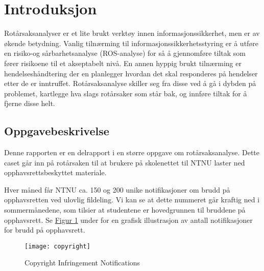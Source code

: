 \chapter{Introduksjon}
Rotårsaksanalyser er et lite brukt verktøy innen informasjonssikkerhet, men er av økende betydning. Vanlig tilnærming til informasjonssikkerhetsstyring er å utføre en risiko-og sårbarhetsanalyse (ROS-analyse) for så å gjennomføre tiltak som fører risikoene til et akseptabelt nivå. En annen hyppig brukt tilnærming er hendelseshåndtering der en planlegger hvordan det skal responderes på hendelser etter de er inntruffet. Rotårsaksanalyse skiller seg fra disse ved å gå i dybden på problemet, kartlegge hva slags rotårsaker som står bak, og innføre tiltak for å fjerne disse helt.

\section{Oppgavebeskrivelse}
Denne rapporten er en delrapport i en større oppgave om rotårsaksanalyse. Dette caset går inn på rotårsaken til at brukere på skolenettet til NTNU laster ned opphavsrettsbeskyttet materiale.

Hver måned får NTNU ca. 150 og 200 unike notifikasjoner om brudd på opphavsretten ved ulovlig fildeling. Vi kan se at dette nummeret går kraftig ned i sommermånedene, som tilsier at studentene er hovedgrunnen til bruddene på opphavsrett. Se \hyperref[fig:copyright]{Figur 1} under for en grafisk illustrasjon av antall notifikasjoner for brudd på opphavsrett.

\begin{figure}[H]
    \centering
    \texttt{[image: copyright]}
    \label{fig:copyright}
    \caption[Copyright Infringement Notifications]{Copyright Infringement Notifications}
\end{figure}

\begin{comment}
\begin{table} [H]
    \begin{tabular}{ | m{12em} | m{12em} | m{12em} | }
        \hline
            \cellcolor{yellow} & \cellcolor{yellow} Breaches & \cellcolor{yellow} Copyright breach/Piracy\\
        \hline
            Policy Violation & Information Security Policy & 2 \\
        \hline
             & IT Policy & 43 \\
        \hline
    \end{tabular}
    \caption{Oversikt over kvantiteten av brudd på policy}
    \label{kritisk_tabell_1}
\end{table}
\end{comment}

